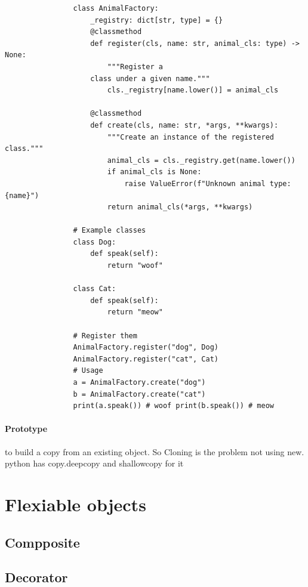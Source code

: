             
            
            \begin{verbatim}
                class AnimalFactory:
                    _registry: dict[str, type] = {}
                    @classmethod
                    def register(cls, name: str, animal_cls: type) -> None:
                        """Register a
                    class under a given name."""
                        cls._registry[name.lower()] = animal_cls
            
                    @classmethod
                    def create(cls, name: str, *args, **kwargs):
                        """Create an instance of the registered class."""
                        animal_cls = cls._registry.get(name.lower())
                        if animal_cls is None:
                            raise ValueError(f"Unknown animal type: {name}")
                        return animal_cls(*args, **kwargs)
            
                # Example classes
                class Dog:
                    def speak(self):
                        return "woof"
            
                class Cat:
                    def speak(self):
                        return "meow"
            
                # Register them
                AnimalFactory.register("dog", Dog)
                AnimalFactory.register("cat", Cat)
                # Usage
                a = AnimalFactory.create("dog")
                b = AnimalFactory.create("cat")
                print(a.speak()) # woof print(b.speak()) # meow
            \end{verbatim}
    \paragraph{Prototype}
        to build a copy from an existing object. So Cloning is the problem not using new. python has copy.deepcopy and shallowcopy for it

\section{Flexiable objects}
    
    \subsection{Compposite}
    
    \subsection{Decorator}

